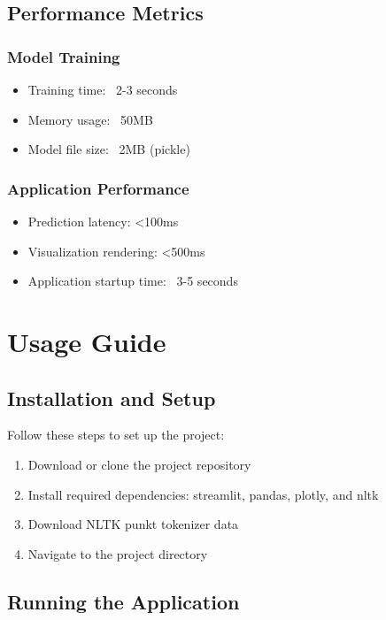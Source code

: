 \documentclass[12pt,a4paper]{report}
\begin{document}
\section{Performance Metrics}

\subsection{Model Training}
\begin{itemize}
    \item Training time: ~2-3 seconds
    \item Memory usage: ~50MB
    \item Model file size: ~2MB (pickle)
\end{itemize}

\subsection{Application Performance}
\begin{itemize}
    \item Prediction latency: <100ms
    \item Visualization rendering: <500ms
    \item Application startup time: ~3-5 seconds
\end{itemize}

\chapter{Usage Guide}

\section{Installation and Setup}

Follow these steps to set up the project:

\begin{enumerate}
    \item Download or clone the project repository
    \item Install required dependencies: streamlit, pandas, plotly, and nltk
    \item Download NLTK punkt tokenizer data
    \item Navigate to the project directory
\end{enumerate}

\section{Running the Application}
\end{document}

